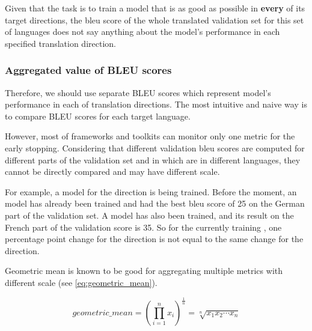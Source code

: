 
Given that the task is to train a model that is as good as possible in
\textbf{every} of its target directions, the \acrshort{bleu} score of
the whole translated validation set for this set of languages does not
say anything about the model's performance in each specified
translation direction.

\subsubsection*{Aggregated value of BLEU scores}

Therefore, we should use separate BLEU scores which represent
model's performance in each of translation directions.
The most intuitive and naive way is to compare BLEU scores
for each target language.

However, most of frameworks and toolkits can monitor only one metric
for the early stopping.
Considering that different validation \acrshort{bleu} scores
are computed for different parts of the validation set and in
which are in different languages, they cannot be directly compared
and may have different scale.

For example, a model for the  direction is being
trained.
Before the moment, an  model has already been trained and
had the best \acrshort{bleu} score of 25 on the German part of the
validation set.
A  model has also been trained, and its result on the
French part of the validation score is 35.
So for the currently training , one percentage point
change for the  direction is not equal to the same change for the
 direction.

Geometric mean is known to be good for aggregating multiple metrics
with different scale (see \cref{eq:geometric_mean}).


\begin{equation}
\label{eq:geometric_mean}
	geometric\_mean = \left(\prod _{i=1}^{n}x_{i}\right)^{\frac {1}{n}}={\sqrt[{n}]{x_{1}x_{2}\cdots x_{n}}}
\end{equation}

\subsection{}
\label{subsection:testing}

